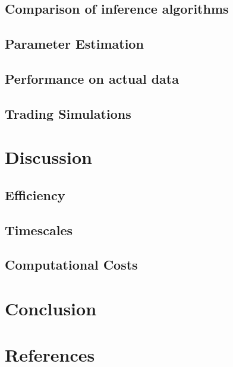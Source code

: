 \documentclass[12pt]{article}
\begin{document}
\subsection{Comparison of inference algorithms}
\subsection{Parameter Estimation}
\subsection{Performance on actual data}
\subsection{Trading Simulations}

\section{Discussion}

\subsection{Efficiency}

\subsection{Timescales}
\subsection{Computational Costs}

\section{Conclusion}

\section{References}
\end{document}
